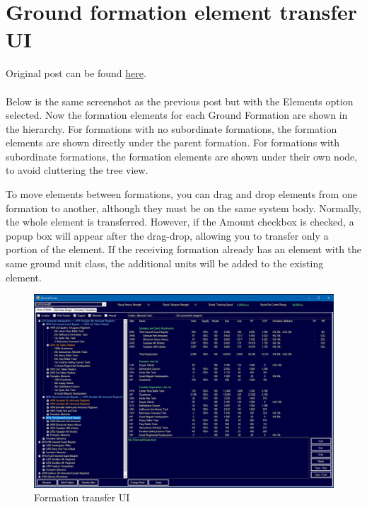 \documentclass[../../Aurora C# unofficial manual.tex]{subfiles}
\begin{document}
	\section{Ground formation element transfer UI}\label{ground_formation_element_transfer_ui}
	Original post can be found
	\href{http://aurora2.pentarch.org/index.php?topic=8495.msg109808#msg109808}{here}.
	\\\\
	
	Below is the same screenshot as the previous post but with the Elements option selected. Now the formation elements for each Ground Formation are shown in the hierarchy. For formations with no subordinate formations, the formation elements are shown directly under the parent formation. For formations with subordinate formations, the formation elements are shown under their own node, to avoid cluttering the tree view.
	
	To move elements between formations, you can drag and drop elements from one formation to another, although they must be on the same system body. Normally, the whole element is transferred. However, if the Amount checkbox is checked, a popup box will appear after the drag-drop, allowing you to transfer only a portion of the element. If the receiving formation already has an element with the same ground unit class, the additional units will be added to the existing element.
	\begin{figure}[H]
		\centering
		\includegraphics[width=0.9\linewidth]{images/ElementsUI}
		\caption[Elements UI]{Formation transfer UI}
		\label{fig:elementsui}
	\end{figure}
\end{document}
